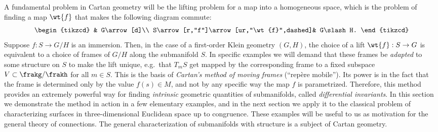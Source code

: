 A fundamental problem in Cartan geometry will be the lifting problem for a map into a homogeneous space, which is the problem of finding a map $\wt{f}$ that makes the following diagram commute:
\[\begin{tikzcd}
                                    & G\arrow[d]\\
    S\arrow[r,"f"]\arrow[ur,"\wt{f}",dashed]& G\slash H.
\end{tikzcd}\]
Suppose $f:S\to G\slash H$ is an immersion. Then, in the case of a first-order Klein geometry $(G,H)$, the choice of a lift $\wt{f}:S\to G$ is equivalent to a choice of frames of $G\slash H$ along the submanifold $S$. In specific examples we will demand that these frames be \emph{adapted} to some structure on $S$ to make the lift unique, e.g.\ that $T_mS$ get mapped by the corresponding frame to a fixed subspace $V\subset \frakg\slash\frakh$ for all $m\in S$. This is the basis of \emph{Cartan's method of moving frames} (``rep\`ere mobile''). Its power is in the fact that the frame is determined only by the value $f(s)\in M$, and not by any specific way the map $f$ is parametrized. Therefore, this method provides an extremely powerful way for finding \emph{intrinsic} geometric quantities of submanifolds, called \emph{differential invariants}. In this section we demonstrate the method in action in a few elementary examples, and in the next section we apply it to the classical problem of characterizing surfaces in three-dimensional Euclidean space up to congruence. These examples will be useful to us as motivation for the general theory of connections. The general characterization of submanifolds with structure is a subject of Cartan geometry.



